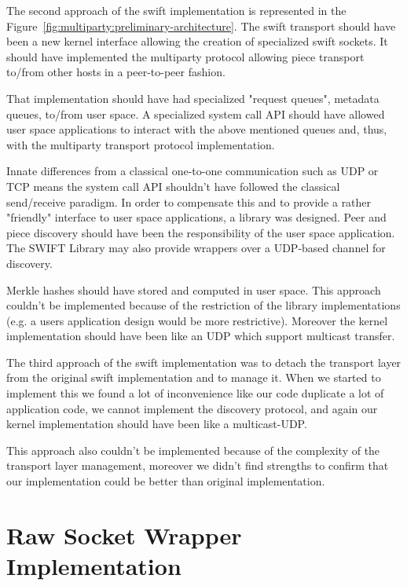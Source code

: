 The second approach of the swift implementation is represented in the
Figure~\ref{fig:multiparty:preliminary-architecture}. The swift transport
should have been a new kernel interface allowing the creation of specialized
swift sockets. It should have implemented the multiparty protocol allowing
piece transport to/from other hosts in a peer-to-peer fashion.

That implementation should have had specialized "request queues", metadata
queues, to/from user space. A specialized system call API should have allowed
user space applications to interact with the above mentioned queues and, thus,
with the multiparty transport protocol implementation.

Innate differences from a classical one-to-one communication such as UDP or
TCP means the system call API shouldn't have followed the classical
send/receive paradigm. In order to compensate this and to provide a rather
"friendly" interface to user space applications, a library was designed. Peer
and piece discovery should have been the responsibility of the user space
application. The SWIFT Library may also provide wrappers over a UDP-based
channel for discovery.

Merkle hashes should have stored and computed in user space. This approach
couldn't be implemented because of the restriction of the library
implementations (e.g. a users application design would be more restrictive).
Moreover the kernel implementation should have been like an UDP which support
multicast transfer.

The third approach of the swift implementation was to detach the transport
layer from the original swift implementation and to manage it. When we started
to implement this we found a lot of inconvenience like our code duplicate a
lot of application code, we cannot implement the discovery protocol, and again
our kernel implementation should have been like a multicast-UDP.

This approach also couldn't be implemented because of the complexity of the
transport layer management, moreover we didn't find strengths to confirm that
our implementation could be better than original implementation.

\section{Raw Socket Wrapper Implementation}
\label{sec:multiparty:raw-socket}


